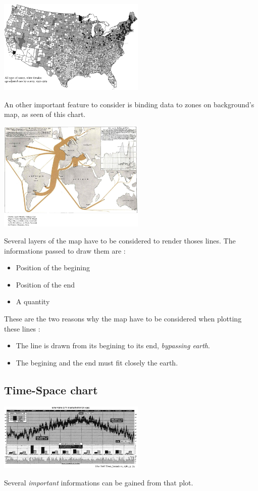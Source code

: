 \centerline{
\includegraphics[width=07cm]{./illustrations/annexes/carte_cancer.eps}
}
An other important feature to consider is binding data to zones on background's map, as seen of this chart.

\centerline{
\includegraphics[width=07cm]{./illustrations/annexes/carte_exports.eps}
}
Several layers of the map have to be considered to render thoses lines. The informations passed to draw them are :
\begin{itemize}
\item Position of the begining
\item Position of the end
\item A quantity
\end{itemize}
These are the two reasons why the map have to be considered when plotting these lines :
\begin{itemize}
\item The line is drawn from its begining to its end, \emph{bypassing earth}.
\item The begining and the end must fit closely the earth. 
\end{itemize}

\subsection{Time-Space chart}
\centerline{
\includegraphics[width=07cm]{./illustrations/annexes/temps_nymeteo.eps}
}
Several \emph{important} informations can be gained from that plot.

